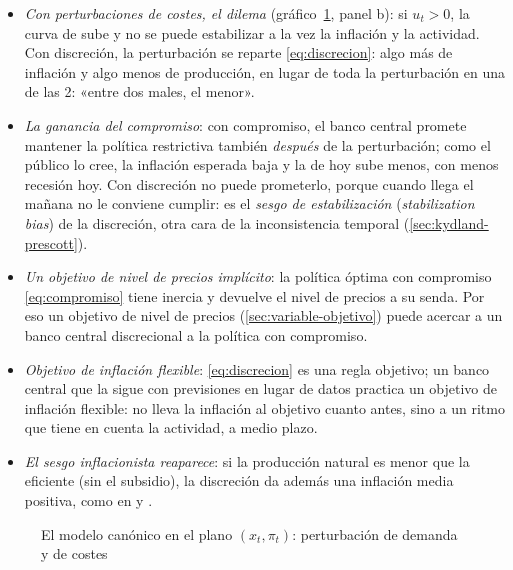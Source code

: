 \documentclass[11pt]{article}
\begin{document}
\begin{itemize}
\begin{itemize}
  \end{itemize}
\item \emph{Con perturbaciones de costes, el dilema} (gráfico~\ref{fig:nek-xpi}, panel b): si $u_t>0$, la curva de  sube y no se puede estabilizar a la vez la inflación y la actividad. Con discreción, la perturbación se reparte \eqref{eq:discrecion}: algo más de inflación y algo menos de producción, en lugar de toda la perturbación en una de las 2: «entre dos males, el menor».
\item \emph{La ganancia del compromiso}\nocite{ClaridaGaliGertler1999Science}: con compromiso, el banco central promete mantener la política restrictiva también \emph{después} de la perturbación; como el público lo cree, la inflación esperada baja y la de hoy sube menos, con menos recesión hoy. Con discreción no puede prometerlo, porque cuando llega el mañana no le conviene cumplir: es el \emph{sesgo de estabilización} (\emph{stabilization bias}) de la discreción, otra cara de la inconsistencia temporal (\ref{sec:kydland-prescott}).
\item \emph{Un objetivo de nivel de precios implícito}: la política óptima con compromiso \eqref{eq:compromiso} tiene inercia y devuelve el nivel de precios a su senda. Por eso un objetivo de nivel de precios (\ref{sec:variable-objetivo}) puede acercar a un banco central discrecional a la política con compromiso.
\item \emph{Objetivo de inflación flexible}: \eqref{eq:discrecion} es una regla objetivo; un banco central que la sigue con previsiones en lugar de datos practica un objetivo de inflación flexible\nocite{Svensson1997Inflation,Svensson2003What}: no lleva la inflación al objetivo cuanto antes, sino a un ritmo que tiene en cuenta la actividad, a medio plazo.
\item \emph{El sesgo inflacionista reaparece}: si la producción natural es menor que la eficiente (sin el subsidio), la discreción da además una inflación media positiva, como en  y \nocite{Gali2015Monetary}.
\end{itemize}

\begin{figure}[H]
\centering
\caption{El modelo canónico en el plano $(x_t,\pi_t)$: perturbación de demanda y de costes}\label{fig:nek-xpi}
\end{figure}
\end{document}
